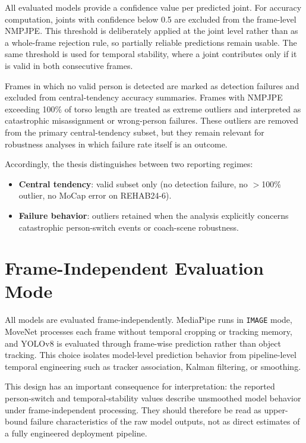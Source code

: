 All evaluated models provide a confidence value per predicted joint. For accuracy computation, joints with confidence below 0.5 are excluded from the frame-level NMPJPE. This threshold is deliberately applied at the joint level rather than as a whole-frame rejection rule, so partially reliable predictions remain usable. The same threshold is used for temporal stability, where a joint contributes only if it is valid in both consecutive frames.

Frames in which no valid person is detected are marked as detection failures and excluded from central-tendency accuracy summaries. Frames with NMPJPE exceeding 100\% of torso length are treated as extreme outliers and interpreted as catastrophic misassignment or wrong-person failures. These outliers are removed from the primary central-tendency subset, but they remain relevant for robustness analyses in which failure rate itself is an outcome.

Accordingly, the thesis distinguishes between two reporting regimes:
\begin{itemize}
  \item \textbf{Central tendency}: valid subset only (no detection failure, no $>$100\% outlier, no MoCap error on REHAB24-6).
  \item \textbf{Failure behavior}: outliers retained when the analysis explicitly concerns catastrophic person-switch events or coach-scene robustness.
\end{itemize}

\section{Frame-Independent Evaluation Mode}
\label{sec:frame-independent}

All models are evaluated frame-independently. MediaPipe runs in \texttt{IMAGE} mode, MoveNet processes each frame without temporal cropping or tracking memory, and YOLOv8 is evaluated through frame-wise prediction rather than object tracking. This choice isolates model-level prediction behavior from pipeline-level temporal engineering such as tracker association, Kalman filtering, or smoothing.

This design has an important consequence for interpretation: the reported person-switch and temporal-stability values describe unsmoothed model behavior under frame-independent processing. They should therefore be read as upper-bound failure characteristics of the raw model outputs, not as direct estimates of a fully engineered deployment pipeline.

